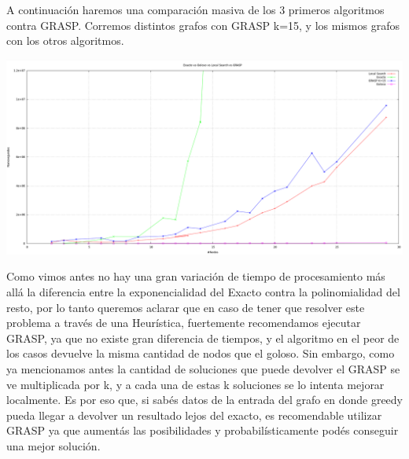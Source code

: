 A continuación haremos una comparación masiva de los 3 primeros algoritmos contra GRASP.
Corremos distintos grafos con GRASP k=15, y los mismos grafos con los otros algoritmos.
\begin{center}
  \includegraphics[width=15cm]{./graficos/todosVStodos.png}
\end{center}
Como vimos antes no hay una gran variación de tiempo de procesamiento más allá la diferencia entre la exponencialidad del Exacto contra la polinomialidad del resto, por lo tanto queremos aclarar que en caso de tener que resolver este
problema a través de una Heurística, fuertemente recomendamos ejecutar GRASP, ya que no existe gran diferencia de tiempos, y el algoritmo en el peor de los casos devuelve la misma cantidad de nodos que el goloso. Sin embargo, como ya 
mencionamos antes la cantidad de soluciones que puede devolver el GRASP se ve multiplicada por k, y a cada una de estas k soluciones se lo intenta mejorar localmente. Es por eso que, si sabés datos de la entrada 
del grafo en donde greedy pueda llegar a devolver un resultado lejos del exacto, es recomendable utilizar GRASP ya que aumentás las posibilidades y probabilísticamente podés conseguir una mejor solución.
